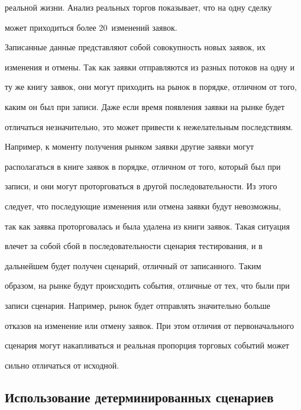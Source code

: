 реальной жизни. Анализ реальных торгов показывает, что на одну сделку


может приходиться более 20~изменений заявок.





  Записанные данные представляют собой совокупность новых заявок, их


изменения и отмены. Так как заявки отправляются из разных потоков на одну и


ту же книгу заявок, они могут приходить на рынок в порядке, отличном от того,


каким он был при записи. Даже если время появления заявки на рынке будет


отличаться незначительно, это может привести к нежелательным последствиям.


Например, к моменту получения рынком заявки другие заявки могут


располагаться в книге заявок в порядке, отличном от того, который был при


записи, и они могут проторговаться в другой последовательности. Из этого


следует, что по\-сле\-ду\-ющие изменения или отмена заявки будут невозможны,


так как заявка проторговалась и была удалена из книги заявок. Такая ситуация


влечет за собой сбой в последовательности сценария тестирования, и в


дальнейшем будет получен сценарий, отличный от записанного. Таким


образом, на рынке будут происходить события, отличные от тех, что были при


записи сценария. Например, рынок будет отправлять значительно больше


отказов на изменение или отмену заявок. При этом отличия от первоначального


сценария могут накапливаться и реальная пропорция торговых событий может


сильно отличаться от исходной.





\vspace*{-6pt}





\subsection{Использование детерминированных сценариев}





